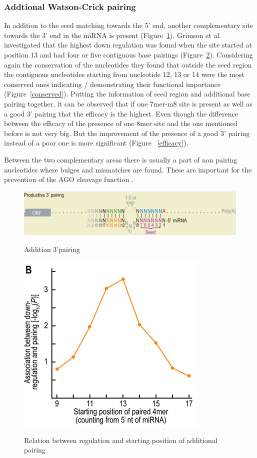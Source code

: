 \documentclass[12pt]{article}
\begin{document}
\subsubsection{Addtional Watson-Crick pairing}
In addition to the seed matching towards the 5' end, another complementary site towards the 3' end in the miRNA is present (Figure~\ref{addipairing}). Grimson et al. \cite{Grimson} investigated that the highest down regulation was found when the site started at position 13 and had four or five contiguous base pairings (Figure~\ref{siteregulation}). Considering again the conservation of the nucleotides they found that outside the seed region the contiguous nucleotides starting from nucleotide 12, 13 or 14 were the most conserved ones indicating / demonstrating their functional importance (Figure~\ref{conserved}). Putting the information of seed region and additional base pairing together, it can be observed that if one 7mer-m8 site is present as well as a good 3' pairing that the efficacy is the highest. Even though the difference between the efficacy of the presence of one 8mer site and the one mentioned before is not very big. But the improvement of the presence of a good 3' pairing instead of a poor one is more significant (Figure ~\ref{efficacy}).   

Between the two complementary areas there is usually a part of non pairing nucleotides where bulges and mismatches are found. These are important for the prevention of the AGO cleavage function \cite{Filipowicz}.

\begin{figure}
\centering
\includegraphics[scale=0.3]{results/additional_pairing.PNG}
\label{addipairing}
\caption{Addition 3'pairing}
\end{figure}

\begin{figure}
\centering
\includegraphics[scale=0.5]{results/sites_regulation.PNG} 
\label{siteregulation}
\caption{Relation between regulation and starting position of additional pairing}
\end{figure}
\end{document}
